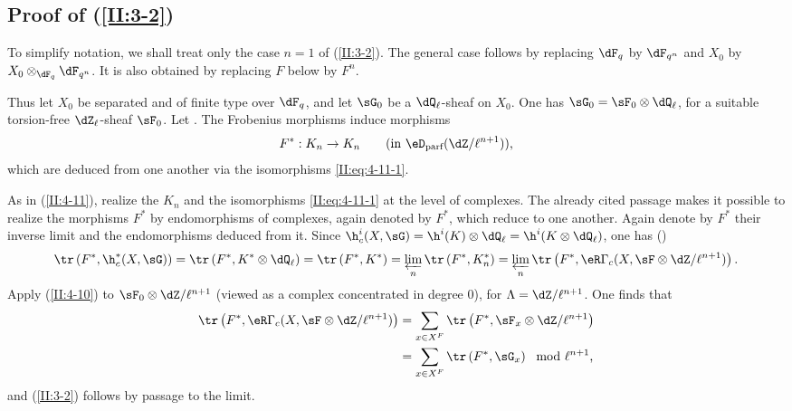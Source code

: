 \subsection{Proof of \texorpdfstring{(\ref{II:3-2})}{(3.2)}}\label{II:4-13}

To simplify notation, we shall treat only the case $n=1$ of
(\ref{II:3-2}). The general case follows by replacing $\dF_q$ by $\dF_{q^n}$ and $X_0$ by $X_0\otimes_{\dF_q}\dF_{q^n}$. It is also obtained by replacing $F$ below by $F^n$.

Thus let $X_0$ be separated and of finite type over $\dF_q$, and let $\sG_0$
be a $\dQ_\ell$-sheaf on $X_0$. One has
$\sG_0=\sF_0\otimes\dQ_\ell$, for a suitable torsion-free
$\dZ_\ell$-sheaf $\sF_0$. Let
. The Frobenius morphisms induce
morphisms
\[
  F^* : K_n\to K_n \qquad \text{(in $\eD_\text{parf}(\dZ/\ell^{n+1})$),}
\]
which are deduced from one another via the isomorphisms
\eqref{II:eq:4-11-1}.

As in (\ref{II:4-11}), realize the $K_n$ and the isomorphisms
\eqref{II:eq:4-11-1} at the level of complexes. The already cited passage
 makes it possible to realize the morphisms $F^*$ by
endomorphisms of complexes, again denoted by $F^*$, which reduce to one
another. Again denote by $F^*$ their inverse limit and the endomorphisms
deduced from it. Since
$\h_c^i(X,\sG) = \h^i(K)\otimes\dQ_\ell = \h^i(K\otimes\dQ_\ell)$, one has
()
\[
  \tr\left(F^*, \h_c^*(X,\sG)\right) = \tr\left(F^*,K^*\otimes\dQ_\ell\right) = \tr\left(F^*,K^*\right) = \varprojlim_n \tr\left(F^*,K_n^*\right) = \varprojlim_n \tr\left(F^*,\eR\Gamma_c(X,\sF\otimes\dZ/\ell^{n+1})\right) \text{.}
\]
Apply (\ref{II:4-10}) to $\sF_0\otimes\dZ/\ell^{n+1}$ (viewed as a complex
concentrated in degree $0$), for $\Lambda=\dZ/\ell^{n+1}$. One finds that
\begin{align*}
  \tr\left(F^*,\eR\Gamma_c(X,\sF\otimes\dZ/\ell^{n+1})\right)
    &= \sum_{x\in X^F} \tr\left(F^*,\sF_x\otimes\dZ/\ell^{n+1}\right) \\
    &= \sum_{x\in X^F} \tr\left(F^*,\sG_x\right) \mod \ell^{n+1} \text{,}
\end{align*}
and (\ref{II:3-2}) follows by passage to the limit.











